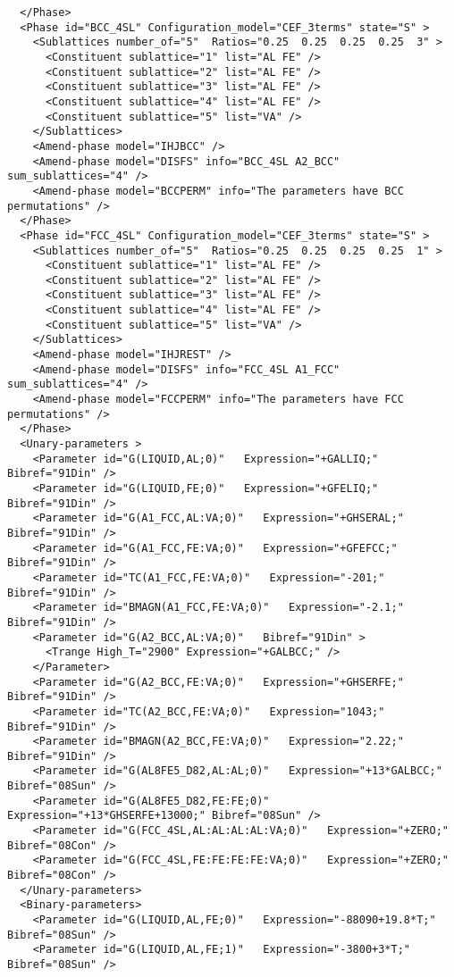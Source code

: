 \documentclass[12pt]{article}
\begin{document}
\begin{appendices}
{\begin{verbatim}
  </Phase>
  <Phase id="BCC_4SL" Configuration_model="CEF_3terms" state="S" >
    <Sublattices number_of="5"  Ratios="0.25  0.25  0.25  0.25  3" >
      <Constituent sublattice="1" list="AL FE" />
      <Constituent sublattice="2" list="AL FE" />
      <Constituent sublattice="3" list="AL FE" />
      <Constituent sublattice="4" list="AL FE" />
      <Constituent sublattice="5" list="VA" />
    </Sublattices>
    <Amend-phase model="IHJBCC" />
    <Amend-phase model="DISFS" info="BCC_4SL A2_BCC" sum_sublattices="4" />
    <Amend-phase model="BCCPERM" info="The parameters have BCC permutations" />
  </Phase>
  <Phase id="FCC_4SL" Configuration_model="CEF_3terms" state="S" >
    <Sublattices number_of="5"  Ratios="0.25  0.25  0.25  0.25  1" >
      <Constituent sublattice="1" list="AL FE" />
      <Constituent sublattice="2" list="AL FE" />
      <Constituent sublattice="3" list="AL FE" />
      <Constituent sublattice="4" list="AL FE" />
      <Constituent sublattice="5" list="VA" />
    </Sublattices>
    <Amend-phase model="IHJREST" />
    <Amend-phase model="DISFS" info="FCC_4SL A1_FCC" sum_sublattices="4" />
    <Amend-phase model="FCCPERM" info="The parameters have FCC permutations" />
  </Phase>
  <Unary-parameters >
    <Parameter id="G(LIQUID,AL;0)"   Expression="+GALLIQ;" Bibref="91Din" />
    <Parameter id="G(LIQUID,FE;0)"   Expression="+GFELIQ;" Bibref="91Din" />
    <Parameter id="G(A1_FCC,AL:VA;0)"   Expression="+GHSERAL;" Bibref="91Din" />
    <Parameter id="G(A1_FCC,FE:VA;0)"   Expression="+GFEFCC;" Bibref="91Din" />
    <Parameter id="TC(A1_FCC,FE:VA;0)"   Expression="-201;" Bibref="91Din" />
    <Parameter id="BMAGN(A1_FCC,FE:VA;0)"   Expression="-2.1;" Bibref="91Din" />
    <Parameter id="G(A2_BCC,AL:VA;0)"   Bibref="91Din" > 
      <Trange High_T="2900" Expression="+GALBCC;" />
    </Parameter>
    <Parameter id="G(A2_BCC,FE:VA;0)"   Expression="+GHSERFE;" Bibref="91Din" />
    <Parameter id="TC(A2_BCC,FE:VA;0)"   Expression="1043;" Bibref="91Din" />
    <Parameter id="BMAGN(A2_BCC,FE:VA;0)"   Expression="2.22;" Bibref="91Din" />
    <Parameter id="G(AL8FE5_D82,AL:AL;0)"   Expression="+13*GALBCC;" Bibref="08Sun" />
    <Parameter id="G(AL8FE5_D82,FE:FE;0)"   Expression="+13*GHSERFE+13000;" Bibref="08Sun" />
    <Parameter id="G(FCC_4SL,AL:AL:AL:AL:VA;0)"   Expression="+ZERO;" Bibref="08Con" />
    <Parameter id="G(FCC_4SL,FE:FE:FE:FE:VA;0)"   Expression="+ZERO;" Bibref="08Con" />
  </Unary-parameters>
  <Binary-parameters>
    <Parameter id="G(LIQUID,AL,FE;0)"   Expression="-88090+19.8*T;" Bibref="08Sun" />
    <Parameter id="G(LIQUID,AL,FE;1)"   Expression="-3800+3*T;" Bibref="08Sun" />

\end{verbatim}}
\end{appendices}
\end{document}
